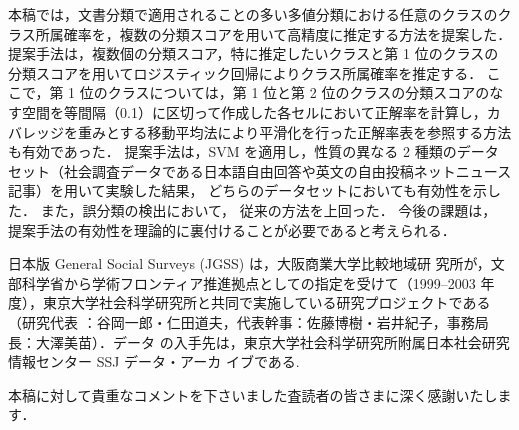 \documentclass[japanese]{jnlp_1.4}
\begin{document}
本稿では，文書分類で適用されることの多い多値分類における任意のクラスのクラス所属確率を，複数の分類スコアを用いて高精度に推定する方法を提案した．
提案手法は，複数個の分類スコア，特に推定したいクラスと第 1 位のクラスの分類スコアを用いてロジスティック回帰によりクラス所属確率を推定する．
ここで，第 1 位のクラスについては，第 1 位と第 2 位のクラスの分類スコアのなす空間を等間隔（0.1）に区切って作成した各セルにおいて正解率を計算し，カバレッジを重みとする移動平均法により平滑化を行った正解率表を参照する方法も有効であった．
提案手法は，SVM を適用し，性質の異なる 2 種類のデータセット（社会調査データである日本語自由回答や英文の自由投稿ネットニュース記事）を用いて実験した結果，
どちらのデータセットにおいても有効性を示した．
また，誤分類の検出において，
従来の方法を上回った．
今後の課題は，
提案手法の有効性を理論的に裏付けることが必要であると考えられる．



\acknowledgment

日本版 General Social Surveys (JGSS) は，大阪商業大学比較地域研
究所が，文部科学省から学術フロンティア推進拠点としての指定を受けて（1999--2003 年
度），東京大学社会科学研究所と共同で実施している研究プロジェクトである（研究代表
：谷岡一郎・仁田道夫，代表幹事：佐藤博樹・岩井紀子，事務局長：大澤美苗）．データ
の入手先は，東京大学社会科学研究所附属日本社会研究情報センター SSJ データ・アーカ
イブである.

本稿に対して貴重なコメントを下さいました査読者の皆さまに深く感謝いたします．
\end{document}
